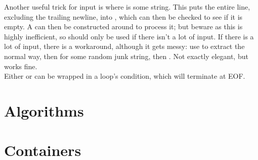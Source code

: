 \documentclass[../main]{subfiles}
\begin{document}
        Another useful trick for input is  where  is some string. This puts the entire line, excluding the trailing newline, into , which can then be checked to see if it is empty. A  can then be constructed around  to process it; but beware as this is highly inefficient, so should only be used if there isn't a lot of input. If there is a lot of input, there is a workaround, although it gets messy: use  to extract the normal way, then  for some random junk string, then . Not exactly elegant, but works fine.\\

        Either  or  can be wrapped in a  loop's condition, which will terminate at EOF.

\section{Algorithms}



\section{Containers}
\end{document}
